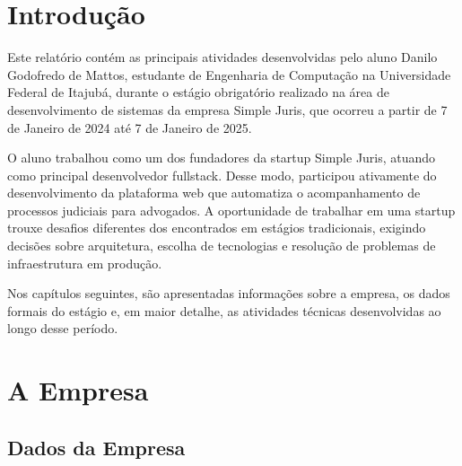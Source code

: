 \documentclass[
	12pt,
	oneside,
	a4paper,
	brazil,
	sumario=tradicional
]{abntex2}
\begin{document}

\frenchspacing

\imprimircapa

\imprimirfolhaderosto*

\listoffigures*
\cleardoublepage

\tableofcontents*
\cleardoublepage

\textual

\chapter{Introdução}

Este relatório contém as principais atividades desenvolvidas pelo aluno Danilo Godofredo de Mattos, estudante de Engenharia de Computação na Universidade Federal de Itajubá, durante o estágio obrigatório realizado na área de desenvolvimento de sistemas da empresa Simple Juris, que ocorreu a partir de 7 de Janeiro de 2024 até 7 de Janeiro de 2025.

O aluno trabalhou como um dos fundadores da startup Simple Juris, atuando como principal desenvolvedor fullstack. Desse modo, participou ativamente do desenvolvimento da plataforma web que automatiza o acompanhamento de processos judiciais para advogados. A oportunidade de trabalhar em uma startup trouxe desafios diferentes dos encontrados em estágios tradicionais, exigindo decisões sobre arquitetura, escolha de tecnologias e resolução de problemas de infraestrutura em produção.

Nos capítulos seguintes, são apresentadas informações sobre a empresa, os dados formais do estágio e, em maior detalhe, as atividades técnicas desenvolvidas ao longo desse período.

\chapter{A Empresa}

\section{Dados da Empresa}
\end{document}

